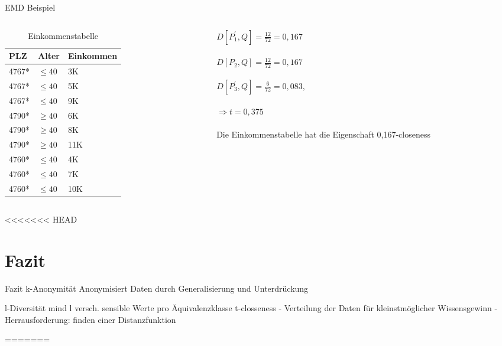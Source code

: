 \begin{frame} {EMD Beispiel}
	
	\begin{columns}[T]
		\begin{column}{0.5\textwidth}
			\begin{table}[]
				\centering
				\label{tclossenessExample}
				\begin{tabular}{|l|l|l|}
					\hline
					\textbf{PLZ}   & \textbf{Alter}    & \textbf{Einkommen} \\\hline
					4767* & $\le 40$ & 3K \\
					4767* & $\le 40$ & 5K \\
					4767* & $\le 40$ & 9K \\\hline
					4790* & $\ge 40$ & 6K \\
					4790* & $\ge 40$ & 8K \\
					4790* & $\ge 40$ & 11K \\\hline
					4760* & $\le 40$ & 4K \\
					4760* & $\le 40$ & 7K \\
					4760* & $\le 40$ & 10K \\\hline
				\end{tabular}
				\caption{Einkommenstabelle}
			\end{table}
		\end{column}
		
		\begin{column}{0.5\textwidth}
			$D[P_1^{'},Q]=\frac{12}{72} = 0,167$\\
			\ \\
			$D[P_2,Q]=\frac{12}{72} = 0,167$\\
			\ \\
			$D[P_3^{'},Q]=\frac{6}{72} = 0,083,$\\
			\ \\
			$\Rightarrow t=0,375$\\
			\ \\
			Die Einkommenstabelle hat die Eigenschaft 0,167-closeness	
		\end{column}
	\end{columns}

<<<<<<< HEAD
\section{Fazit}
\begin{frame} {Fazit}
k-Anonymität
	Anonymisiert Daten durch Generalisierung und Unterdrückung
    
l-Diversität
	mind l versch. sensible Werte pro Äquivalenzklasse
t-closseness
	- Verteilung  der Daten für kleinstmöglicher Wissensgewinn	
    - Herrausforderung: finden einer    	  Distanzfunktion
\end{frame}
=======
\end{frame}
